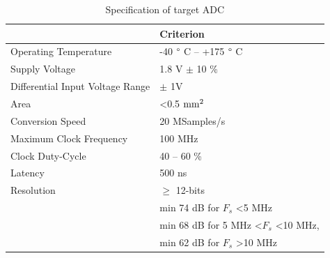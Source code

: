 \begin{table}[htp]
	\centering
	\caption{Specification of target ADC}
	\label{tbl:adc-spec}
	\begin{tabular}{ll}
		\toprule
		& Criterion                                                                                                                                                   \\ \midrule
		Operating Temperature            & -40 $\degree$ C -- +175 $\degree$ C                                                                                               \\
		Supply Voltage                   & 1.8 V $\pm$ 10 \%                                                                                                                              \\
		Differential Input Voltage Range & $\pm$ 1V                                                                                                                                       \\
		Area                             & \textless 0.5 \(\rm mm^2\)                                                                                                                                      \\
		Conversion Speed                 & 20 MSamples/s                                                                                                                                               \\
		Maximum Clock Frequency          & 100 MHz\\
		Clock Duty-Cycle                 & 40 -- 60 \%                                                                                                                                                 \\
		Latency                          & 500 ns                                                                                                                                                      \\
		Resolution                       & $\geq$ 12-bits                                                                                          \\
		\rowcolor{white}\multirow{-1}{*}{SNDR }   & min 74 dB for $F_s$ \textless 5 MHz\\
		\rowcolor{white}                      & min 68 dB for 5 MHz \textless $F_s$  \textless 10 MHz,\\
		\rowcolor{white}						& min 62 dB for $F_s$  \textgreater 10 MHz  \\

\end{tabular}
\end{table}
